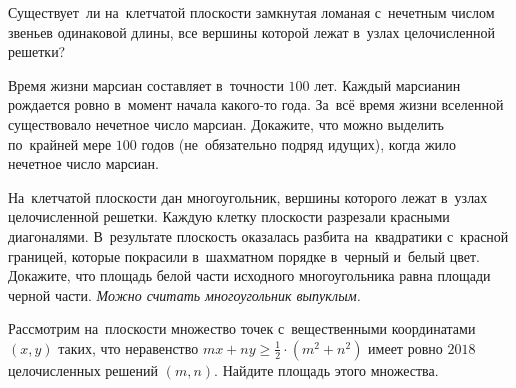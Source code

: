 \begin{problems}
\item
Существует~ли на~клетчатой плоскости замкнутая ломаная с~нечетным числом
звеньев одинаковой длины, все вершины которой лежат в~узлах целочисленной
решетки?

\item
Время жизни марсиан составляет в~точности $100$ лет.
Каждый марсианин рождается ровно в~момент начала какого-то года.
За~всё время жизни вселенной существовало нечетное число марсиан.
Докажите, что можно выделить по~крайней мере $100$ годов
(не~обязательно подряд идущих), когда жило нечетное число марсиан.



\item
На~клетчатой плоскости дан многоугольник, вершины которого лежат в~узлах
целочисленной решетки.
Каждую клетку плоскости разрезали красными диагоналями.
В~результате плоскость оказалась разбита на~квадратики с~красной границей,
которые покрасили в~шахматном порядке в~черный и~белый цвет.
Докажите, что площадь белой части исходного многоугольника равна площади черной
части.
\emph{Можно считать многоугольник выпуклым.}

\item
Рассмотрим на~плоскости множество точек с~вещественными координатами $(x, y)$
таких, что неравенство $m x + n y \geq \frac{1}{2} \cdot (m^2 + n^2)$ имеет
ровно $2018$ целочисленных решений $(m, n)$.
Найдите площадь этого множества.


\end{problems}

